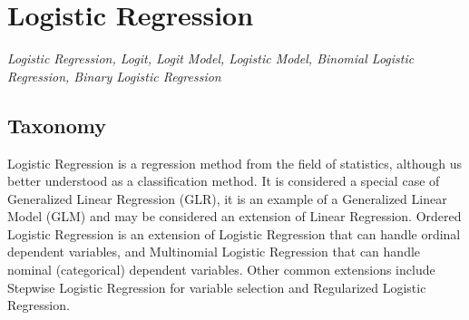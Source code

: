 
\section{Logistic Regression} 
\label{sec:logistic}

\emph{Logistic Regression, Logit, Logit Model, Logistic Model, Binomial Logistic Regression, Binary Logistic Regression}

\subsection{Taxonomy}
Logistic Regression is a regression method from the field of statistics, although us better understood as a classification method. It is considered a special case of Generalized Linear Regression (GLR), it is an example of a Generalized Linear Model (GLM) and may be considered an extension of Linear Regression.
Ordered Logistic Regression is an extension of Logistic Regression that can handle ordinal dependent variables, and Multinomial Logistic Regression that can handle nominal (categorical) dependent variables. Other common extensions include Stepwise Logistic Regression for variable selection and Regularized Logistic Regression.

